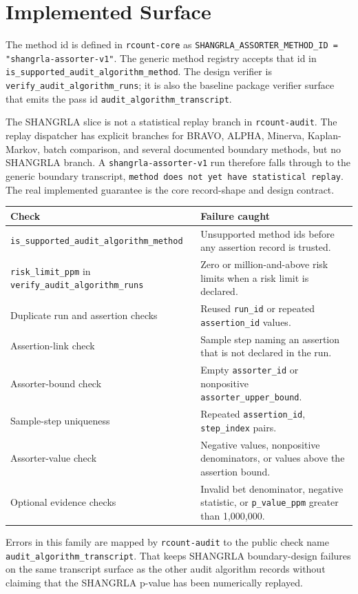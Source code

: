 \section{Implemented Surface}

The method id is defined in \texttt{rcount-core} as
\texttt{SHANGRLA\_ASSORTER\_METHOD\_ID = "shangrla-assorter-v1"}. The generic
method registry accepts that id in \texttt{is\_supported\_audit\_algorithm\_method}.
The design verifier is \texttt{verify\_audit\_algorithm\_runs}; it is also the
baseline package verifier surface that emits the pass id
\texttt{audit\_algorithm\_transcript}.

The SHANGRLA slice is not a statistical replay branch in \texttt{rcount-audit}.
The replay dispatcher has explicit branches for BRAVO, ALPHA, Minerva,
Kaplan-Markov, batch comparison, and several documented boundary methods, but
no SHANGRLA branch. A \texttt{shangrla-assorter-v1} run therefore falls through
to the generic boundary transcript, \texttt{method does not yet have statistical
replay}. The real implemented guarantee is the core record-shape and design
contract.

\begin{center}
\small
\begin{tabularx}{\textwidth}{lX}
\toprule
Check & Failure caught \\
\midrule
\texttt{is\_supported\_audit\_algorithm\_method} & Unsupported method ids before any assertion record is trusted. \\
\texttt{risk\_limit\_ppm} in \texttt{verify\_audit\_algorithm\_runs} & Zero or million-and-above risk limits when a risk limit is declared. \\
Duplicate run and assertion checks & Reused \texttt{run\_id} or repeated \texttt{assertion\_id} values. \\
Assertion-link check & Sample step naming an assertion that is not declared in the run. \\
Assorter-bound check & Empty \texttt{assorter\_id} or nonpositive \texttt{assorter\_upper\_bound}. \\
Sample-step uniqueness & Repeated \texttt{assertion\_id}, \texttt{step\_index} pairs. \\
Assorter-value check & Negative values, nonpositive denominators, or values above the assertion bound. \\
Optional evidence checks & Invalid bet denominator, negative statistic, or \texttt{p\_value\_ppm} greater than 1,000,000. \\
\bottomrule
\end{tabularx}
\end{center}

Errors in this family are mapped by \texttt{rcount-audit} to the public check
name \texttt{audit\_algorithm\_transcript}. That keeps SHANGRLA boundary-design
failures on the same transcript surface as the other audit algorithm records
without claiming that the SHANGRLA p-value has been numerically replayed.
